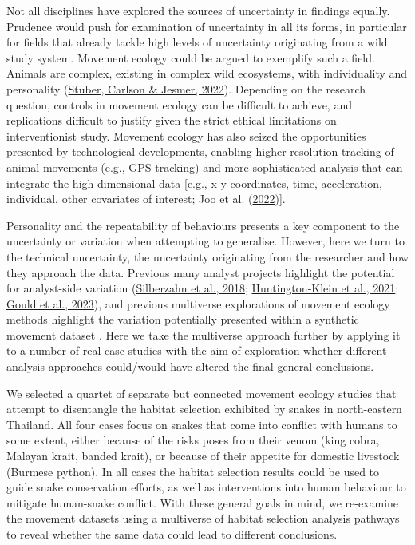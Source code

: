 \documentclass[10pt,a4paper]{article}
\begin{document}
Not all disciplines have explored the sources of uncertainty in findings equally.
Prudence would push for examination of uncertainty in all its forms, in particular for fields that already tackle high levels of uncertainty originating from a wild study system.
Movement ecology could be argued to exemplify such a field.
Animals are complex, existing in complex wild ecosystems, with individuality and personality (\protect\hyperlink{ref-stuber_spatial_2022}{Stuber, Carlson \& Jesmer, 2022}).
Depending on the research question, controls in movement ecology can be difficult to achieve, and replications difficult to justify given the strict ethical limitations on interventionist study.
Movement ecology has also seized the opportunities presented by technological developments, enabling higher resolution tracking of animal movements (e.g., GPS tracking) and more sophisticated analysis that can integrate the high dimensional data {[}e.g., x-y coordinates, time, acceleration, individual, other covariates of interest; Joo et al. (\protect\hyperlink{ref-joo_recent_2022}{2022}){]}.

Personality and the repeatability of behaviours presents a key component to the uncertainty or variation when attempting to generalise.
However, here we turn to the technical uncertainty, the uncertainty originating from the researcher and how they approach the data.
Previous many analyst projects highlight the potential for analyst-side variation (\protect\hyperlink{ref-silberzahn_many_2018}{Silberzahn et al., 2018}; \protect\hyperlink{ref-huntingtonklein_influence_2021}{Huntington‐Klein et al., 2021}; \protect\hyperlink{ref-gould_same_2023}{Gould et al., 2023}), and previous multiverse explorations of movement ecology methods highlight the variation potentially presented within a synthetic movement dataset .
Here we take the multiverse approach further by applying it to a number of real case studies with the aim of exploration whether different analysis approaches could/would have altered the final general conclusions.

We selected a quartet of separate but connected movement ecology studies that attempt to disentangle the habitat selection exhibited by snakes in north-eastern Thailand.
All four cases focus on snakes that come into conflict with humans to some extent, either because of the risks poses from their venom (king cobra, Malayan krait, banded krait), or because of their appetite for domestic livestock (Burmese python).
In all cases the habitat selection results could be used to guide snake conservation efforts, as well as interventions into human behaviour to mitigate human-snake conflict.
With these general goals in mind, we re-examine the movement datasets using a multiverse of habitat selection analysis pathways to reveal whether the same data could lead to different conclusions.
\end{document}
